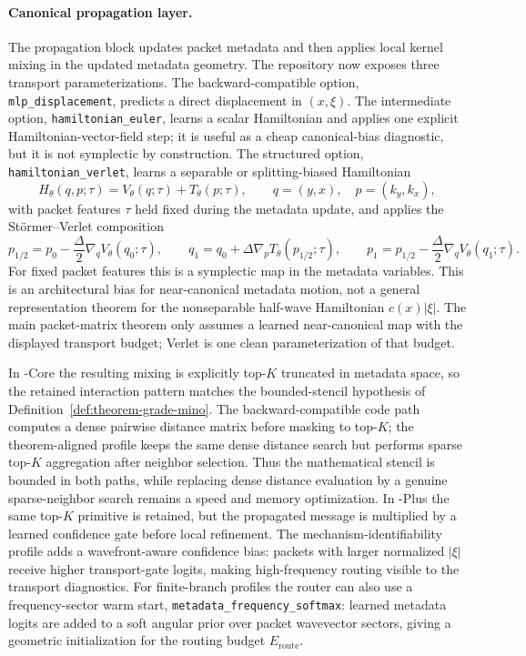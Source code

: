 \paragraph{Canonical propagation layer.}
The propagation block updates packet metadata and then applies local kernel mixing in the updated metadata geometry. The repository now exposes three transport parameterizations. The backward-compatible option, \texttt{mlp\_displacement}, predicts a direct displacement in $(x,\xi)$. The intermediate option, \texttt{hamiltonian\_euler}, learns a scalar Hamiltonian and applies one explicit Hamiltonian-vector-field step; it is useful as a cheap canonical-bias diagnostic, but it is not symplectic by construction. The structured option, \texttt{hamiltonian\_verlet}, learns a separable or splitting-biased Hamiltonian
\[
H_\theta(q,p;\tau)=V_\theta(q;\tau)+T_\theta(p;\tau),
\qquad q=(y,x),\quad p=(k_y,k_x),
\]
with packet features $\tau$ held fixed during the metadata update, and applies the St\"ormer--Verlet composition
\[
p_{1/2}=p_0-\frac{\Delta}{2}\nabla_qV_\theta(q_0;\tau),\qquad
q_1=q_0+\Delta\nabla_pT_\theta(p_{1/2};\tau),\qquad
p_1=p_{1/2}-\frac{\Delta}{2}\nabla_qV_\theta(q_1;\tau).
\]
For fixed packet features this is a symplectic map in the metadata variables. This is an architectural bias for near-canonical metadata motion, not a general representation theorem for the nonseparable half-wave Hamiltonian $c(x)|\xi|$.  The main packet-matrix theorem only assumes a learned near-canonical map with the displayed transport budget; Verlet is one clean parameterization of that budget.

In \MiNO-Core the resulting mixing is explicitly top-$K$ truncated in metadata space, so the retained interaction pattern matches the bounded-stencil hypothesis of Definition~\ref{def:theorem-grade-mino}. The backward-compatible code path computes a dense pairwise distance matrix before masking to top-$K$; the theorem-aligned profile keeps the same dense distance search but performs sparse top-$K$ aggregation after neighbor selection. Thus the mathematical stencil is bounded in both paths, while replacing dense distance evaluation by a genuine sparse-neighbor search remains a speed and memory optimization. In \MiNO-Plus the same top-$K$ primitive is retained, but the propagated message is multiplied by a learned confidence gate before local refinement.  The mechanism-identifiability profile adds a wavefront-aware confidence bias: packets with larger normalized $|\xi|$ receive higher transport-gate logits, making high-frequency routing visible to the transport diagnostics.  For finite-branch profiles the router can also use a frequency-sector warm start, \texttt{metadata\_frequency\_softmax}: learned metadata logits are added to a soft angular prior over packet wavevector sectors, giving a geometric initialization for the routing budget $E_{\mathrm{route}}$.

